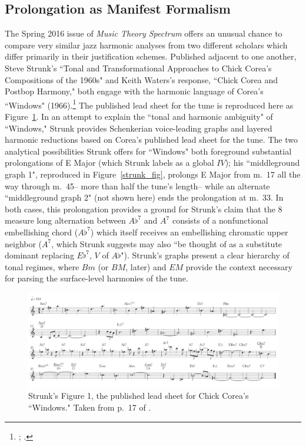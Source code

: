 \subsection{Prolongation as Manifest Formalism}

The Spring 2016 issue of \emph{Music Theory Spectrum} offers an unusual chance to compare very similar jazz harmonic analyses from two different scholars which differ primarily in their justification schemes.  Published adjacent to one another, Steve Strunk's ``Tonal and Transformational Approaches to Chick Corea's Compositions of the 1960s" and Keith Waters's response, ``Chick Corea and Postbop Harmony," both engage with the harmonic language of Corea's ``Windows" (1966).\footnote{\cite{strunk2016}; \cite{waters2016}.}  The published lead sheet for the tune is reproduced here as Figure~\ref{windows}.  In an attempt to explain the ``tonal and harmonic ambiguity" of ``Windows," Strunk provides Schenkerian voice-leading graphs and layered harmonic reductions based on Corea's published lead sheet for the tune.  The two analytical possibilities Strunk offers for ``Windows" both foreground substantial prolongations of E Major (which Strunk labels as a global $IV$); his ``middleground graph 1", reproduced in Figure~\ref{strunk_fig}, prolongs E Major from m.\ 17 all the way through m.\ 45-- more than half the tune's length-- while an alternate ``middleground graph 2" (not shown here) ends the prolongation at m.\ 33.  In both cases, this prolongation provides a ground for Strunk's claim that the 8 measure long alternation between $A\flat^7$ and $A^7$ consists of a nonfunctional embellishing chord ($A\flat^7$) which itself receives an embellishing chromatic upper neighbor ($A^7$, which Strunk suggests may also ``be thought of as a substitute dominant replacing $E\flat^7$, $V$ of $A\flat$").  Strunk's graphs present a clear hierarchy of tonal regimes, where $Bm$ (or $BM$, later) and $EM$ provide the context necessary for parsing the surface-level harmonies of the tune.

\begin{figure}
	\centering
	\caption{Strunk's Figure 1, the published lead sheet for Chick Corea's ``Windows."  Taken from p.\ 17 of \cite{strunk2016}.}\label{windows}
	\includegraphics[width=6in]{strunk_windows.png}	
\end{figure}

